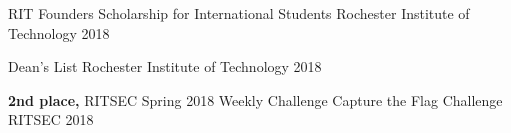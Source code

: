 



\begin{cvhonors}

  \cvhonor
    {} %
    {RIT Founders Scholarship for International Students} %
    {Rochester Institute of Technology} %
    {2018} %

  \cvhonor
    {} %
    {Dean's List} %
    {Rochester Institute of Technology} %
    {2018} %
    
  \cvhonor
    {} %
    {{\bf2nd place,} RITSEC Spring 2018 Weekly Challenge Capture the Flag Challenge} %
    {RITSEC} %
    {2018} %


\end{cvhonors}

